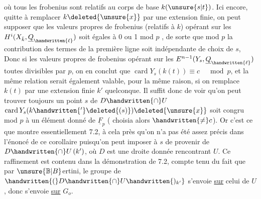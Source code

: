 où tous les frobenius sont relatifs au corps de base $k(\unsure{s|t})$. Ici encore, quitte à remplacer $k\deleted{\unsure{x}}$ par une extension finie, on peut supposer que les valeurs propres de frobenius (relatifs à $k$) opérant sur les $H^i(X_{\bar k},\underline{Q}_{\handwritten{\ell}})$  soit égales à 0 ou 1 mod $p$ , de sorte que mod $p$  la contribution des termes de la première ligne soit indépendante de choix de $s$,  Donc si les valeurs propres de frobenius opérant sur les $E^{n-1}(Y_s,\underline{Q}_{\handwritten{\ell}})$  toutes divisibles par $p$, on en conclut que $\operatorname{card}Y_{s}(k(t))\equiv c\quad\bmod p$, et la même relation serait également valable, pour la même raison, si on remplace $k(t)$ par une extension finie $k'$ quelconque.  Il suffit donc de voir qu'on peut trouver toujours un point  $s$ de $D\handwritten{\cap}U$  $\operatorname{card}Y_s(k\handwritten{'}\deleted{(s)})\deleted{\unsure{x}}$ soit congru mod $p$ à un élément donné de $\underline{F}_p$ ( choisia alors $\handwritten{\ne}c$). Or c'est ce que montre essentiellement 7.2, à cela près qu'on n'a pas été assez précis dans l'énoncé de ce corollaire puisqu'on peut imposer à $s$ de provenir de $D\handwritten{\cap}U\,(k')$, où $D$ est une droite donnée  rencontrant $U$. Ce raffinement est contenu dans la démonstration de 7.2, compte tenu du fait que par $\unsure{\mathbb{B}|B}$ertini, le groupe  de $\handwritten{(}D\handwritten{\cap}U\handwritten{)_{k'}}$ s'envoie \uline{sur} celui de $U$, donc s'envoie \uline{sur} $G_o$.
